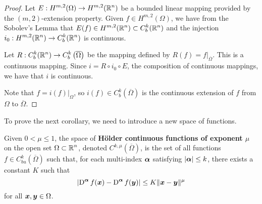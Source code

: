\begin{proof}
Let $\displaystyle E:H^{m,2}(\Omega) \rightarrow H^{m,2}(\mathbb{R}^n)$ be a bounded
linear mapping provided by the $(m,2)$-extension property.  Given
$\displaystyle f\in H^{m,2}(\Omega)$, we have from the Sobolev's Lemma that
$\displaystyle E(f) \in H^{m,2}(\mathbb{R}^n) \subset C^k_b(\mathbb{R}^n)$ and the
injection $\displaystyle i_0:H^{m,2}(\mathbb{R}^n) \to C_b^k(\mathbb{R}^n)$ is
continuous.

Let $\displaystyle R: C_b^k(\mathbb{R}^n) \to C_b^k\left(\overline{\Omega}\right)$
be the mapping defined by $\displaystyle R(f) = f\big|_{\overline{\Omega}}$.
This is a continuous mapping.
Since $i = R\circ i_0 \circ E$, the composition of continuous mappings,
we have that $i$ is continuous.

Note that $\displaystyle f = i(f)\big|_{\Omega}$, so
$\displaystyle i(f) \in C^k_b(\overline{\Omega})$
is the continuous extension of $f$ from $\Omega$ to $\overline{\Omega}$.
\end{proof}

To prove the next corollary, we need to introduce a new space of
functions.

\begin{defn} \label{defnHolderContFunct}
Given $0 < \mu \leq 1$, the space of {\bfseries Hölder continuous
functions of exponent $\mu$} on the open set $\displaystyle \Omega \subset \mathbb{R}^n$,
denoted $\displaystyle C^{k,\mu}(\overline{\Omega})$, is
the set of all functions $\displaystyle f \in C_{bu}^k(\overline{\Omega})$
such that, for each multi-index ${\bm{\alpha}}$ satisfying
$|{\bm{\alpha}}|\leq k$, there exists a constant $K$ such that
\[
  \left| \operatorname{D}^{{\bm{\alpha}}} f({\bm{x}}) - \operatorname{D}^{{\bm{\alpha}}} f({\bm{y}}) \right|
  \leq K \|{\bm{x}} - {\bm{y}} \|^{\mu}
\]
for all ${\bm{x}}, {\bm{y}} \in \Omega$.
\end{defn}

